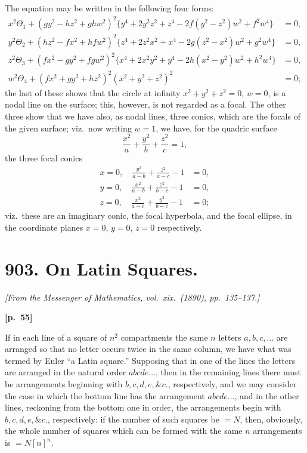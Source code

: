 \documentclass[11pt,a4paper]{book}
\begin{document}
The equation may be written in the following four forms:
\begin{align*}
x^2\Theta_1 + (gy^2 - hz^2 + ghw^2)^2\{y^4 + 2y^2 z^2 + z^4 - 2f(y^2 - z^2)w^2 + f^2 w^4\} &= 0, \\
y^2\Theta_2 + (hz^2 - fx^2 + hfw^2)^2\{z^4 + 2z^2 x^2 + x^4 - 2g(z^2 - x^2)w^2 + g^2 w^4\} &= 0, \\
z^2\Theta_3 + (fx^2 - gy^2 + fgw^2)^2\{x^4 + 2x^2 y^2 + y^4 - 2h(x^2 - y^2)w^2 + h^2 w^4\} &= 0, \\
w^2\Theta_4 + (fx^2 + gy^2 + hz^2)^2(x^2 + y^2 + z^2)^2 &= 0;
\end{align*}
the last of these shows that the circle at infinity $x^2 + y^2 + z^2 = 0$, $w = 0$, is a nodal line on the surface; this, however, is not regarded as a focal. The other three show that we have also, as nodal lines, three conics, which are the focals of the given surface; viz.\ now writing $w = 1$, we have, for the quadric surface
$$
\frac{x^2}{a} + \frac{y^2}{b} + \frac{z^2}{c} = 1,
$$
the three focal conics
\begin{align*}
x = 0, \quad \frac{y^2}{a - b} + \frac{z^2}{a - c} - 1 &= 0, \\
y = 0, \quad \frac{x^2}{a - b} + \frac{z^2}{b - c} - 1 &= 0, \\
z = 0, \quad \frac{x^2}{a - c} + \frac{y^2}{b - c} - 1 &= 0;
\end{align*}
viz.\ these are an imaginary conic, the focal hyperbola, and the focal ellipse, in the coordinate planes $x = 0$, $y = 0$, $z = 0$ respectively.

\newpage

\section*{903. On Latin Squares.}

\noindent\textit{[From the Messenger of Mathematics, vol.\ xix.\ (1890), pp.\ 135--137.]}

\vspace{0.5em}
\noindent\textbf{[p.\ 55]}

If in each line of a square of $n^2$ compartments the same $n$ letters $a, b, c, \ldots$ are arranged so that no letter occurs twice in the same column, we have what was termed by Euler ``a Latin square.'' Supposing that in one of the lines the letters are arranged in the natural order $abcde\ldots$, then in the remaining lines there must be arrangements beginning with $b, c, d, e, \&c.$, respectively, and we may consider the case in which the bottom line has the arrangement $abcde\ldots$, and in the other lines, reckoning from the bottom one in order, the arrangements begin with $b, c, d, e, \&c.$, respectively: if the number of such squares be $= N$, then, obviously, the whole number of squares which can be formed with the same $n$ arrangements is $= N[n]^n$.
\end{document}
